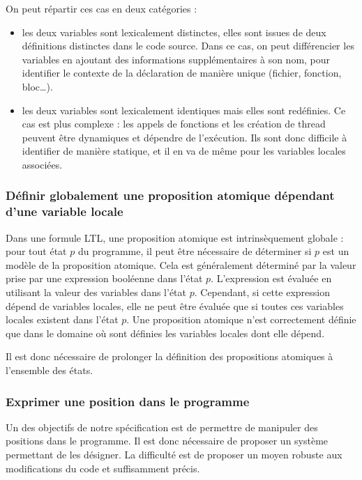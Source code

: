 On peut répartir ces cas en deux catégories :

\begin{itemize}
\item
  les deux variables sont lexicalement distinctes, elles sont issues de
  deux définitions distinctes dans le code source. Dans ce cas, on peut
  différencier les variables en ajoutant des informations
  supplémentaires à son nom, pour identifier le contexte de la
  déclaration de manière unique (fichier, fonction, bloc\ldots{}).
\item
  les deux variables sont lexicalement identiques mais elles sont
  redéfinies. Ce cas est plus complexe : les appels de fonctions et les
  création de thread peuvent être dynamiques et dépendre de l'exécution.
  Ils sont donc difficile à identifier de manière statique, et il en va
  de même pour les variables locales associées.
\end{itemize}

\subsubsection{Définir globalement une proposition atomique dépendant
d'une variable locale}

Dans une formule LTL, une proposition atomique est intrinsèquement
globale : pour tout état \(p\) du programme, il peut être nécessaire de
déterminer si \(p\) est un modèle de la proposition atomique. Cela est
généralement déterminé par la valeur prise par une expression booléenne
dans l'état \(p\). L'expression est évaluée en utilisant la valeur des
variables dans l'état \(p\). Cependant, si cette expression dépend de
variables locales, elle ne peut être évaluée que si toutes ces variables
locales existent dans l'état \(p\). Une proposition atomique n'est
correctement définie que dans le domaine où sont définies les variables
locales dont elle dépend.

Il est donc nécessaire de prolonger la définition des propositions
atomiques à l'ensemble des états.

\subsubsection{Exprimer une position dans le programme}

Un des objectifs de notre spécification est de permettre de manipuler
des positions dans le programme. Il est donc nécessaire de proposer un
système permettant de les désigner. La difficulté est de proposer un
moyen robuste aux modifications du code et suffisamment précis.

